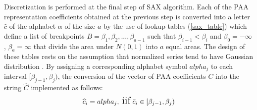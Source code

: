 Discretization is performed at the final step of SAX algorithm. Each of the PAA representation coefficients obtained at the previous step 
is converted into a letter $\widehat{c}$ of the alphabet $\alpha$ of the size $a$ by the use of lookup tables (\ref{sax_table}) which define a 
list of breakpoints $B=\beta_{1}, \beta_{2}, ... , \beta_{a-1}$ such that $\beta_{i-1} < \beta_{i}$ and $\beta_{0} = -\infty$, $\beta_{a} = \infty$ 
that divide the area under $N(0,1)$ into $a$ equal areas. The design of these tables rests on the assumption that normalized series tend to have 
Gaussian distribution \cite{citeulike:10141990}.
By assigning a corresponding alphabet symbol $alpha_{j}$ to each interval $[\beta_{j-1},\beta_{j})$, the conversion of the vector of PAA coefficients 
$C$ into the string $\widehat{C}$ implemented as follows: 
\begin{equation}
\Large
\widehat{c}_{i} = alpha_{j}, \; \text{iif} \; \bar{c}_{i} \in [\beta_{j-1},\beta_{j})
\label{eq:sax_alphabet}
\end{equation}


